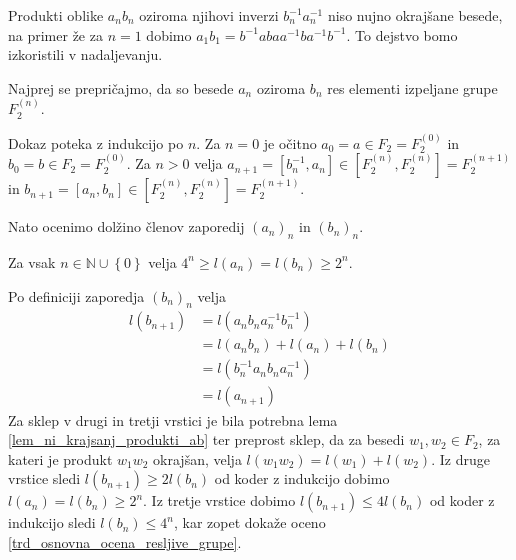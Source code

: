 \documentclass[mat1, tisk]{fmfdelo}
\numberwithin{equation}{section}  %
\begin{document}
\begin{opomba}
Produkti oblike $a_n b_n$ oziroma njihovi inverzi $b_n ^{-1} a_n ^{-1}$ niso nujno okrajšane besede, na primer že za $n = 1$ dobimo $a_1 b_1 = b^{-1} a b a a^{-1} b a^{-1} b^{-1}$. To dejstvo bomo izkoristili v nadaljevanju. 
\end{opomba}

Najprej se prepričajmo, da so besede $a_n$ oziroma $b_n$ res elementi izpeljane grupe $F_2^{(n)}$.

\begin{lema}
\label{lem_besede_ab_so_elementi_izpeljane_grupe}
\end{lema}
\begin{dokaz}
    Dokaz poteka z indukcijo po $n$. Za $n = 0$ je očitno $a_0 = a \in F_2 = F_2^{(0)}$ in $b_0 = b \in F_2 = F_2^{(0)}$. Za $n > 0$ velja $a_{n + 1} = [b_n^{-1}, a_n] \in \left[ F_2^{(n)}, F_2^{(n)} \right] = F_2^{(n + 1)}$ in $b_{n+1} = [a_{n}, b_{n}] \in  \left[ F_2^{(n)}, F_2^{(n)} \right] = F_2^{(n + 1)}$. 
\end{dokaz}

Nato ocenimo dolžino členov zaporedij $(a_{n})_n$ in $(b_{n})_n$.

\begin{lema}
\label{lem_ocena_dolzine_clenov_zaporedij_ab}
Za vsak $n \in \mathbb{N} \cup \left\{ 0\right\}$ velja $4^{n} \ge l(a_{n}) = l(b_{n}) \ge 2^{n}$.
\end{lema}
\begin{dokaz}
Po definiciji zaporedja $(b_n)_n$ velja \begin{align*}
    l(b_{n+1}) &= l(a_{n} b_{n} a_{n}^{-1} b_{n}^{-1}) \\
     &= l(a_{n} b_{n}) + l(a_{n}) + l(b_{n}) \\
     &= l(b_{n}^{-1} a_{n} b_{n} a_{n}^{-1}) \\
     &= l(a_{n + 1})
\end{align*}
Za sklep v drugi in tretji vrstici je bila potrebna lema \ref{lem_ni_krajsanj_produkti_ab} ter preprost sklep, da za besedi $w_1, w_2 \in F_2$, za kateri je produkt $w_1 w_2$ okrajšan, velja $l(w_1 w_2) = l(w_1) + l(w_2)$.
Iz druge vrstice sledi $l(b_{n+1}) \ge  2 l(b_n)$ od koder z indukcijo dobimo $l(a_{n}) = l(b_{n}) \ge 2^{n}$. Iz tretje vrstice dobimo $l(b_{n+1}) \le 4 l(b_n)$ od koder z indukcijo sledi $l(b_n) \le 4^{n}$, kar zopet dokaže oceno \ref{trd_osnovna_ocena_resljive_grupe}.    
\end{dokaz}
\end{document}
